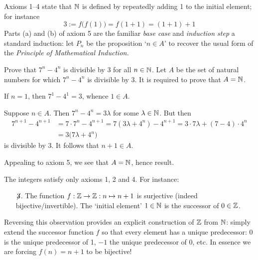 
Axioms 1--4 state that $\mathbb{N}$ is defined by repeatedly adding 1 to the initial element; for instance
\[
	3:=f\bigl(f(1)\bigr)=f(1+1)=(1+1)+1
\]
Parts (a) and (b) of axiom 5 are the familiar \emph{base case} and \emph{induction step} a standard induction: let $P_n$ be the proposition `$n\in A$' to recover the usual form of the \emph{Principle of Mathematical Induction.}

\begin{example}{}{}
	Prove that $7^n-4^n$ is divisible by 3 for all $n\in\mathbb{N}$.
	\smallbreak
	Let $A$ be the set of natural numbers for which $7^n-4^n$ is divisible by 3. It is required to prove that $A=\mathbb{N}$.
	\begin{enumeratea}
	  \item If $n=1$, then $7^1-4^1=3$, whence $1\in A$.
	  \item Suppose $n\in A$. Then $7^n-4^n=3\lambda$ for some $\lambda\in\mathbb{N}$. But then
		\begin{align*}
			7^{n+1}-4^{n+1}&=7\cdot 7^n-4^{n+1}=7(3\lambda+4^n)-4^{n+1}=3\cdot 7\lambda+(7-4)\cdot 4^n\\
			&=3\bigl(7\lambda+4^n\bigr)
		\end{align*}
	is divisible by 3. It follows that $n+1\in A$.
	\end{enumeratea}
	Appealing to axiom 5, we see that $A=\mathbb{N}$, hence result.
\end{example}

\goodbreak


The integers satisfy only axioms 1, 2 and 4. For instance:
\begin{itemize}
  \item[$\not\!3$.] The function $f:\mathbb{Z}\to\mathbb{Z}:n\mapsto n+1$ is surjective (indeed bijective/invertible). The `initial element' $1\in\mathbb{N}$ is the successor of $0\in\mathbb{Z}$.  
\end{itemize}

Reversing this observation provides an explicit construction of $\mathbb{Z}$ from $\mathbb{N}$: simply extend the successor function $f$ so that every element has a unique predecessor: 0 is the unique predecessor of 1, $-1$ the unique predecessor of 0, etc. In essence we are forcing $f(n)=n+1$ to be bijective!


\goodbreak


